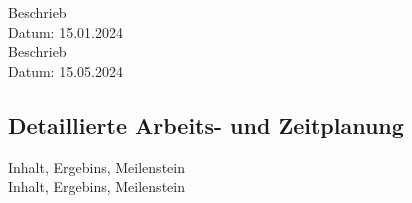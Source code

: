     \label{Ms:Bsp01}
        Beschrieb\\
        Datum: 15.01.2024\\
    
    \label{Ms:Bsp02}
        Beschrieb\\
        Datum: 15.05.2024\\


\subsection{Detaillierte Arbeits- und Zeitplanung}

        Inhalt, Ergebins, Meilenstein\\
        
        Inhalt, Ergebins, Meilenstein\\














